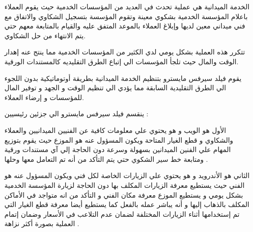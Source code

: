 \begin{flushright}
	\textarabic[utf]{الخدمة الميدانية هي عملية تحدث في العديد من المؤسسات الخدمية حيث يقوم العملاء باعلام المؤسسة الخدمية بشكوي معينة وتقوم المؤسسة بتسجيل الشكاوي والاتفاق مع فني ميداني معين  لديها وإبلاغ العملاء بالموعد المتفق عليه والقيام بالمتابعة معهم حتي يتم الانتهاء من حل الشكاوي.}
\end{flushright}

\begin{flushright}
	\textarabic[utf]{تتكرر هذه العملية بشكل يومي لدي الكثير من المؤسسات الخدمية  مما ينتج عنه إهدار الوقت والمال حيث تلجأ المؤسسات الي إتباع الطرق التقليديه كالمستندات الورقية.}
\end{flushright}

\begin{flushright}
	\textarabic[utf]{يقوم فيلد سيرفس مايسترو بتنظيم الخدمة الميدانية بطريقة أوتوماتيكية بدون اللجوء الي الطرق التقليدية السابقة مما يؤدي الي تنظيم الوقت و الجهد و توفير المال للمؤسسات و إرضاء العملاء.}
\end{flushright}

\begin{flushright}
	\textarabic[utf]{ينقسم فيلد سيرفس مايسترو الي جزئين رئيسيين :}
\end{flushright}

\begin{flushright}
	\textarabic[utf]{الأول هو الويب و هو  يحتوي علي معلومات كافية عن الفنيين الميدانيين والعملاء والشكاوي و قطع الغيار المتاحة ويكون المسؤول عنه هو الموزع حيث يقوم بتوزيع المهام علي الفنين الميدانين بسهولة وسرعة دون الحاجة إلي آي مستندات ورقية ومتابعة خط سير الشكوي حتي يتم التأكد من أنه تم التعامل معها وحلها .}
\end{flushright}

\begin{flushright}
	\textarabic[utf]{الثاني هو الأندرويد و هو  يحتوي علي الزيارات الخاصة لكل فني ويكون المسؤول عنه هو الفني حيث يستطيع معرفة الزيارات المكلف بها دون الحاجة لزيارة المؤسسة الخدمية بشكل يومي و يستطيع الموزع معرفة مكان الفني و التأكد من انه متواجد في الأماكن المكلف بالذهاب إليها و أنه يباشر عمله بالفعل كما يستطيع أيضا معرفة قطع الغيار التي تم إستخدامها أثناء الزيارات المختلفة لضمان عدم التلاعب في الأسعار وضمان إتمام العملية بصورة أكثر نزاهة .}
\end{flushright}
